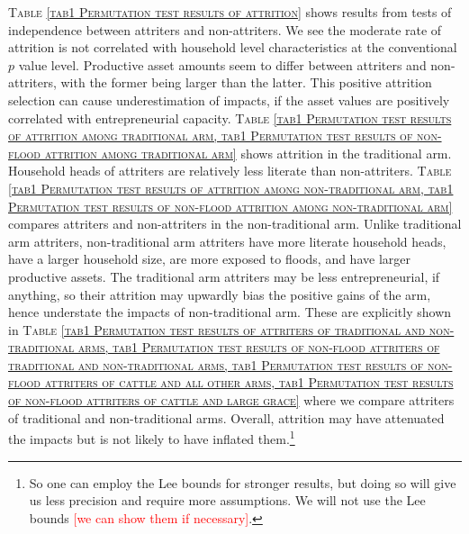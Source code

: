 	\textsc{\normalsize Table \ref{tab1 Permutation test results of attrition}} shows results from tests of independence between attriters and non-attriters. We see the moderate rate of attrition is not correlated with household level characteristics at the conventional $p$ value level. Productive asset amounts seem to differ between attriters and non-attriters, with the former being larger than the latter. This positive attrition selection can cause underestimation of impacts, if the asset values are positively correlated with entrepreneurial capacity. \textsc{\normalsize Table \ref{tab1 Permutation test results of attrition among traditional arm, tab1 Permutation test results of non-flood attrition among traditional arm}} shows attrition in the \textsf{traditional} arm. Household heads of attriters are relatively less literate than non-attriters. \textsc{\normalsize Table \ref{tab1 Permutation test results of attrition among non-traditional arm, tab1 Permutation test results of non-flood attrition among non-traditional arm}} compares attriters and non-attriters in the non-\textsf{traditional} arm. Unlike \textsf{traditional} arm attriters, non-\textsf{traditional} arm attriters have more literate household heads, have a larger household size, are more exposed to floods, and have larger productive assets. The \textsf{traditional} arm attriters may be less entrepreneurial, if anything, so their attrition may upwardly bias the positive gains of the arm, hence understate the impacts of non-\textsf{traditional} arm. These are explicitly shown in \textsc{\normalsize Table \ref{tab1 Permutation test results of attriters of traditional and non-traditional arms, tab1 Permutation test results of non-flood attriters of traditional and non-traditional arms, tab1 Permutation test results of non-flood attriters of cattle and all other arms, tab1 Permutation test results of non-flood attriters of cattle and large grace}} where we compare attriters of \textsf{traditional} and non-\textsf{traditional} arms. Overall, attrition may have attenuated the impacts but is not likely to have inflated them.\footnote{So one can employ the Lee bounds for stronger results, but doing so will give us less precision and require more assumptions. We will not use the Lee bounds \textcolor{red}{[we can show them if necessary]}. }

